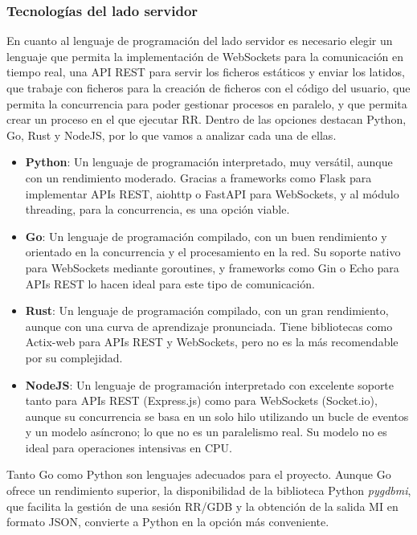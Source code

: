 \subsubsection{Tecnologías del lado servidor} \label{sec:tecnologias-servidor}

En cuanto al lenguaje de programación del lado servidor es necesario elegir un lenguaje que permita la implementación de WebSockets para la comunicación en tiempo real, una API REST para servir los ficheros estáticos y enviar los latidos, que trabaje con ficheros para la creación de ficheros con el código del usuario, que permita la concurrencia para poder gestionar procesos en paralelo, y que permita crear un proceso en el que ejecutar RR.
Dentro de las opciones destacan Python, Go, Rust y NodeJS, por lo que vamos a analizar cada una de ellas.

\begin{itemize}
    \item \textbf{Python}: Un lenguaje de programación interpretado, muy versátil, aunque con un rendimiento moderado. Gracias a frameworks como Flask para implementar APIs REST, aiohttp o FastAPI para WebSockets, y al módulo threading, para la concurrencia, es una opción viable.
    \item \textbf{Go}: Un lenguaje de programación compilado, con un buen rendimiento y orientado en la concurrencia y el procesamiento en la red. Su soporte nativo para WebSockets mediante goroutines, y frameworks como Gin o Echo para APIs REST lo hacen ideal para este tipo de comunicación.
    \item \textbf{Rust}: Un lenguaje de programación compilado, con un gran rendimiento, aunque con una curva de aprendizaje pronunciada. Tiene bibliotecas como Actix-web para APIs REST y WebSockets, pero no es la más recomendable por su complejidad. 
    \item \textbf{NodeJS}: Un lenguaje de programación interpretado con excelente soporte tanto para APIs REST (Express.js) como para WebSockets (Socket.io), aunque su concurrencia se basa en un solo hilo utilizando un bucle de eventos y un modelo asíncrono; lo que no es un paralelismo real. Su modelo no es ideal para operaciones intensivas en CPU.
\end{itemize}

Tanto Go como Python son lenguajes adecuados para el proyecto. Aunque Go ofrece un rendimiento superior, la disponibilidad de la biblioteca Python \textit{pygdbmi}, que facilita la gestión de una sesión RR/GDB y la obtención de la salida MI en formato JSON, convierte a Python en la opción más conveniente.

